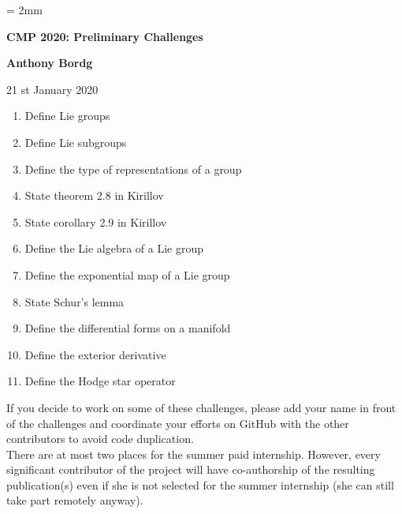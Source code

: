 \documentclass[12pt]{article}
\begin{document}
%
\parskip = 2mm
\begin{center}
{\bf\Large CMP 2020: Preliminary Challenges}

\vspace{3mm}

{\large\bf Anthony Bordg}
\vspace {3mm}

{21 st January 2020}  
\end{center}

\begin{enumerate}
	\item Define Lie groups	
	\item Define Lie subgroups
	\item Define the type of representations of a group
	\item State theorem 2.8 in Kirillov
	\item State corollary 2.9 in Kirillov
	\item Define the Lie algebra of a Lie group
	\item Define the exponential map of a Lie group
	\item State Schur's lemma
	\item Define the differential forms on a manifold
	\item Define the exterior derivative
	\item Define the Hodge star operator
\end{enumerate}

If you decide to work on some of these challenges, please add your name in front of the challenges and coordinate your efforts on GitHub with the other contributors to avoid code duplication. \\
There are at most two places for the summer paid internship. However, every significant contributor of the project will have co-authorship of the resulting publication(s) even if she is not selected for the summer internship (she can still take part remotely anyway).
\end{document}
